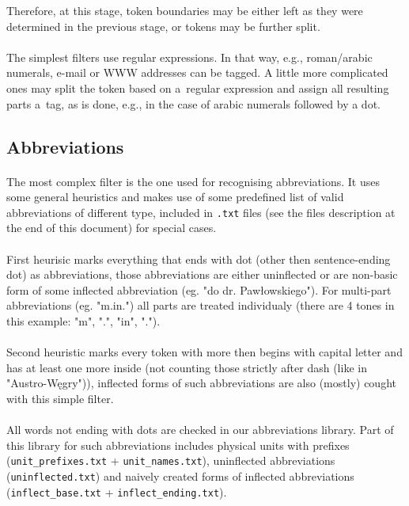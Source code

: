 \documentclass[oneside,12pt]{article}
\begin{document}
Therefore, at this stage, token boundaries may be either left as they were determined in the previous stage, or tokens may be further split.
    
\paragraph{}
The simplest filters use regular expressions. In that way, e.g., roman/arabic numerals, e-mail or WWW addresses can be tagged. A little more complicated ones may split the token based on a~regular expression and assign all resulting parts a~tag, as is done, e.g., in the case of arabic numerals followed by a dot.

\subsection{Abbreviations}

\paragraph{}
The most complex filter is the one used for recognising abbreviations. It uses some general heuristics and makes use of some predefined list of valid abbreviations of different type, included in \texttt{.txt} files (see the files description at the end of this document) for special cases.

\paragraph{}
First heurisic marks everything that ends with dot (other then sentence-ending dot) as abbreviations, those abbreviations are either uninflected or are non-basic form of some inflected abbreviation (eg. "do dr. Pawłowskiego"). For multi-part abbreviations (eg. "m.in.") all parts are treated individualy (there are 4 tones in this example: "m", ".", "in", ".").

\paragraph{}
Second heuristic marks every token with more then begins with capital letter and has at least one more inside (not counting those strictly after dash (like in "Austro-Węgry")), inflected forms of such abbreviations are also (mostly) cought with this simple filter.

\paragraph{}
All words not ending with dots are checked in our abbreviations library. Part of this library for such abbreviations includes physical units with prefixes (\texttt{unit\_prefixes.txt} + \texttt{unit\_names.txt}), uninflected abbreviations (\texttt{uninflected.txt}) and naively created forms of inflected abbreviations (\texttt{inflect\_base.txt} + \texttt{inflect\_ending.txt}).
\end{document}
